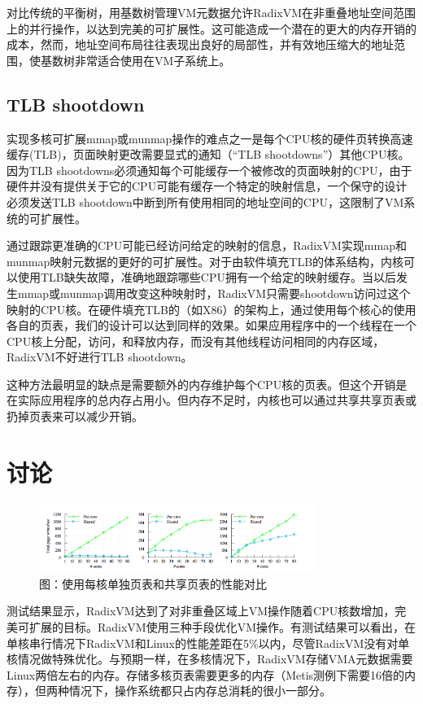 对比传统的平衡树，用基数树管理VM元数据允许RadixVM在非重叠地址空间范围上的并行操作，以达到完美的可扩展性。这可能造成一个潜在的更大的内存开销的成本，然而，地址空间布局往往表现出良好的局部性，并有效地压缩大的地址范围，使基数树非常适合使用在VM子系统上。


\subsection{TLB shootdown}

实现多核可扩展mmap或munmap操作的难点之一是每个CPU核的硬件页转换高速缓存(TLB)，页面映射更改需要显式的通知（“TLB
shootdowns”）其他CPU核。因为TLB
shootdowns必须通知每个可能缓存一个被修改的页面映射的CPU，由于硬件并没有提供关于它的CPU可能有缓存一个特定的映射信息，一个保守的设计必须发送TLB
shootdown中断到所有使用相同的地址空间的CPU，这限制了VM系统的可扩展性。

通过跟踪更准确的CPU可能已经访问给定的映射的信息，RadixVM实现mmap和munmap映射元数据的更好的可扩展性。对于由软件填充TLB的体系结构，内核可以使用TLB缺失故障，准确地跟踪哪些CPU拥有一个给定的映射缓存。当以后发生mmap或munmap调用改变这种映射时，RadixVM只需要shootdown访问过这个映射的CPU核。在硬件填充TLB的（如X86）的架构上，通过使用每个核心的使用各自的页表，我们的设计可以达到同样的效果。如果应用程序中的一个线程在一个CPU核上分配，访问，和释放内存，而没有其他线程访问相同的内存区域，RadixVM不好进行TLB shootdown。


这种方法最明显的缺点是需要额外的内存维护每个CPU核的页表。但这个开销是在实际应用程序的总内存占用小。但内存不足时，内核也可以通过共享共享页表或扔掉页表来可以减少开销。


\section{讨论}

\begin{figure}[ht]
  \centering
  \includegraphics[width=0.8\textwidth]{figures/appedix_pagetable.png} 
  \caption*{图：使用每核单独页表和共享页表的性能对比}
\end{figure}


测试结果显示，RadixVM达到了对非重叠区域上VM操作随着CPU核数增加，完美可扩展的目标。RadixVM使用三种手段优化VM操作。有测试结果可以看出，在单核串行情况下RadixVM和Linux的性能差距在5\%以内，尽管RadixVM没有对单核情况做特殊优化。与预期一样，在多核情况下，RadixVM存储VMA元数据需要Linux两倍左右的内存。存储多核页表需要更多的内存（Metis测例下需要16倍的内存），但两种情况下，操作系统都只占内存总消耗的很小一部分。

